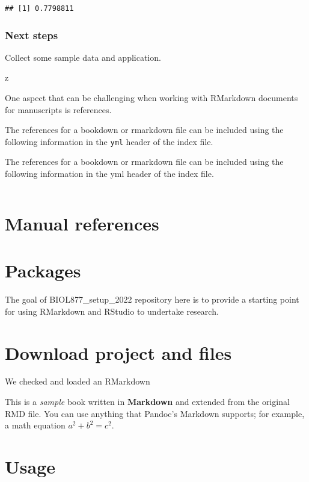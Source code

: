 \documentclass[
]{book}
\begin{document}
\begin{verbatim}
## [1] 0.7798811
\end{verbatim}

\hypertarget{next-steps}{%
\subsubsection{Next steps}\label{next-steps}}

Collect some sample data and application.

z

One aspect that can be challenging when working with RMarkdown documents for manuscripts is references.

The references for a bookdown or rmarkdown file can be included using the following information in the \texttt{yml} header of the index file.

The references for a bookdown or rmarkdown file can be included using the following information in the yml header of the index file.

\begin{verbatim}
\end{verbatim}

\hypertarget{manual-references}{%
\section{Manual references}\label{manual-references}}

\hypertarget{packages}{%
\section{Packages}\label{packages}}

The goal of BIOL877\_setup\_2022 repository here is to provide a starting point for using RMarkdown and RStudio to undertake research.

\hypertarget{download-project-and-files}{%
\section{Download project and files}\label{download-project-and-files}}

We checked and loaded an RMarkdown

This is a \emph{sample} book written in \textbf{Markdown} and extended from the original RMD file. You can use anything that Pandoc's Markdown supports; for example, a math equation \(a^2 + b^2 = c^2\).

\hypertarget{usage}{%
\section{Usage}\label{usage}}
\end{document}
